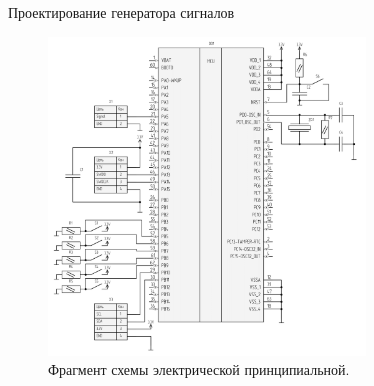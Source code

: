 \documentclass[10pt]{beamer}
\begin{document}
\begin{frame}{Проектирование генератора сигналов}
  \begin{figure}
  \includegraphics[width=0.75\textwidth]{scheme-cropped}
  \caption{Фрагмент схемы электрической принципиальной.}
  \end{figure}
\end{frame}
\end{document}
